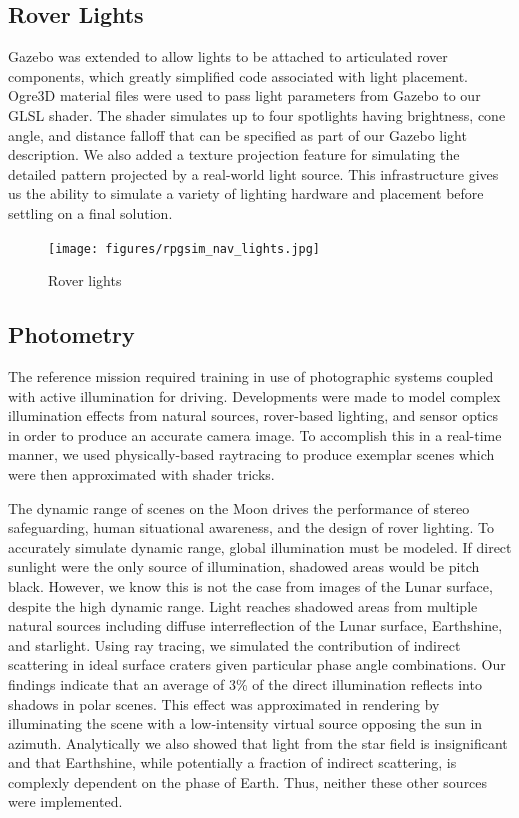 \documentclass[twocolumn,letterpaper]{IEEEAerospaceCLS}  %
\begin{document}
\subsection{Rover Lights}
Gazebo was extended to allow lights to be attached to articulated rover components, which greatly simplified code associated with light placement. 
Ogre3D material files were used to pass light parameters from Gazebo to our GLSL shader. 
The shader simulates up to four spotlights having brightness, cone angle, and distance falloff that can be specified as part of our Gazebo light description.
We also added a texture projection feature for simulating the detailed pattern projected by a real-world light source. 
This infrastructure gives us the ability to simulate a variety of lighting hardware and placement before settling on a final solution.
\begin{figure}[h!]
  \texttt{[image: figures/rpgsim\_nav\_lights.jpg]}
  \caption{Rover lights}
  \label{fig:roverlights}
\end{figure}

\subsection {Photometry}
The reference mission required training in use of photographic systems coupled with active illumination for driving. 
Developments were made to model complex illumination effects from natural sources, rover-based lighting, and sensor optics in order to produce an accurate camera image. 
To accomplish this in a real-time manner, we used physically-based raytracing to produce exemplar scenes which were then approximated with shader tricks. 

The dynamic range of scenes on the Moon drives the performance of stereo safeguarding, human situational awareness, and the design of rover lighting. 
To accurately simulate dynamic range, global illumination must be modeled. 
If direct sunlight were the only source of illumination, shadowed areas would be pitch black. 
However, we know this is not the case from images of the Lunar surface, despite the high dynamic range. 
Light reaches shadowed areas from multiple natural sources including diffuse interreflection of the Lunar surface, Earthshine, and starlight. 
Using ray tracing, we simulated the contribution of indirect scattering in ideal surface craters given particular phase angle combinations. 
Our findings indicate that an average of 3\% of the direct illumination reflects into shadows in polar scenes. 
This effect was approximated in rendering by illuminating the scene with a low-intensity virtual source opposing the sun in azimuth. 
Analytically we also showed that light from the star field is insignificant and that Earthshine, while potentially a fraction of indirect scattering, is complexly dependent on the phase of Earth. 
Thus, neither these other sources were implemented.       
\end{document}
